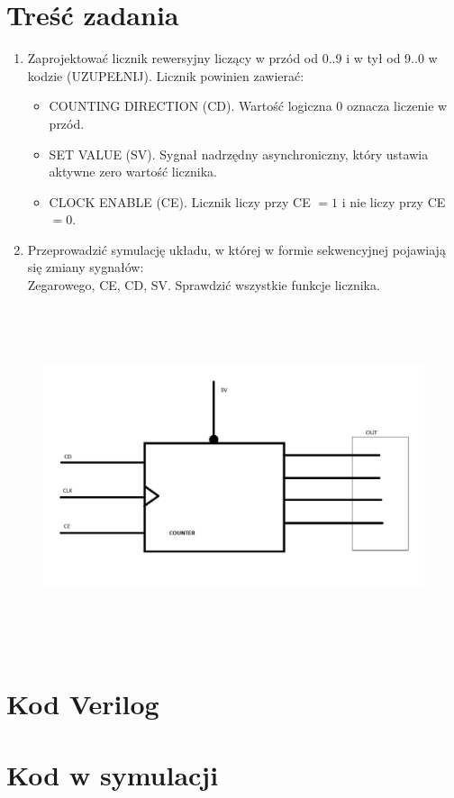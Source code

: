 \section*{Treść zadania}
\begin{enumerate}
    \item Zaprojektować licznik rewersyjny liczący w przód od 0..9 i w tył od 9..0 w kodzie (UZUPEŁNIJ). Licznik powinien zawierać:
    \begin{itemize}
        \item COUNTING DIRECTION (CD). Wartość logiczna 0 oznacza liczenie w przód.
        \item SET VALUE (SV). Sygnał nadrzędny asynchroniczny, który ustawia aktywne zero wartość licznika.
        \item CLOCK ENABLE (CE). Licznik liczy przy CE $ = 1$ i nie liczy przy CE $= 0$.
    \end{itemize}
    \item Przeprowadzić symulację układu, w której w formie sekwencyjnej pojawiają się zmiany sygnałów: \\
    Zegarowego, CE, CD, SV. Sprawdzić wszystkie funkcje licznika.
\end{enumerate}

\begin{figure}[!htb]
    \centering
    \includegraphics[height=10cm]{./images/Counter.jpg}
\end{figure}

\clearpage

\section{Kod Verilog}



\section{Kod w symulacji}


